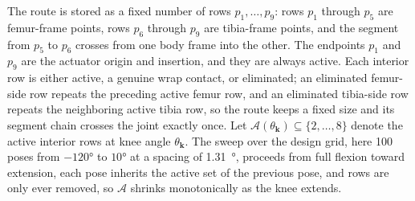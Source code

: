 The route is stored as a fixed number of rows $p_{1},\ldots,p_{9}$: rows $p_{1}$ through $p_{5}$ are femur-frame points, rows $p_{6}$ through $p_{9}$ are tibia-frame points, and the segment from $p_{5}$ to $p_{6}$ crosses from one body frame into the other. The endpoints $p_{1}$ and $p_{9}$ are the actuator origin and insertion, and they are always active. Each interior row is either active, a genuine wrap contact, or eliminated; an eliminated femur-side row repeats the preceding active femur row, and an eliminated tibia-side row repeats the neighboring active tibia row, so the route keeps a fixed size and its segment chain crosses the joint exactly once. Let $\mathcal{A}(\theta_{\mathbf{k}}) \subseteq \{2,\ldots,8\}$ denote the active interior rows at knee angle $\theta_{\mathbf{k}}$. The sweep over the design grid, here 100 poses from $\ang{-120}$ to $\ang{+10}$ at a spacing of \qty{1.31}{\degree}, proceeds from full flexion toward extension, each pose inherits the active set of the previous pose, and rows are only ever removed, so $\mathcal{A}$ shrinks monotonically as the knee extends.

